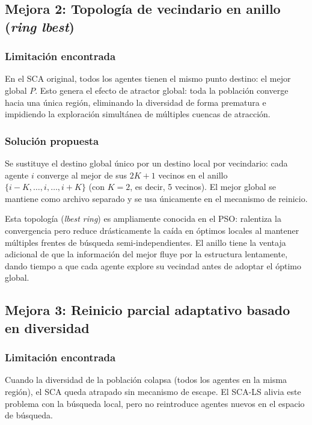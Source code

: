 \documentclass[12pt,a4paper]{article}
\begin{document}
\subsection{Mejora 2: Topología de vecindario en anillo (\textit{ring lbest})}

\subsubsection{Limitación encontrada}

En el SCA original, todos los agentes tienen el mismo punto destino: el mejor global $P$. Esto genera el efecto de atractor global: toda la población converge hacia una única región, eliminando la diversidad de forma prematura e impidiendo la exploración simultánea de múltiples cuencas de atracción.

\subsubsection{Solución propuesta}

Se sustituye el destino global único por un destino local por vecindario: cada agente $i$ converge al mejor de sus $2K+1$ vecinos en el anillo $\{i-K, \ldots, i, \ldots, i+K\}$ (con $K=2$, es decir, 5 vecinos). El mejor global se mantiene como archivo separado y se usa únicamente en el mecanismo de reinicio.

Esta topología (\textit{lbest ring}) es ampliamente conocida en el PSO: ralentiza la convergencia pero reduce drásticamente la caída en óptimos locales al mantener múltiples frentes de búsqueda semi-independientes. El anillo tiene la ventaja adicional de que la información del mejor fluye por la estructura lentamente, dando tiempo a que cada agente explore su vecindad antes de adoptar el óptimo global.

\subsection{Mejora 3: Reinicio parcial adaptativo basado en diversidad}

\subsubsection{Limitación encontrada}

Cuando la diversidad de la población colapsa (todos los agentes en la misma región), el SCA queda atrapado sin mecanismo de escape. El SCA-LS alivia este problema con la búsqueda local, pero no reintroduce agentes nuevos en el espacio de búsqueda.
\end{document}
